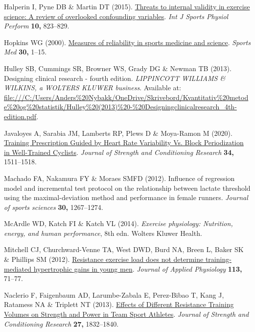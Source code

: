 \documentclass[
  letterpaper,
  DIV=11,
  numbers=noendperiod]{scrreprt}
\newlength{\cslhangindent}
\newenvironment{CSLReferences}[2] %
 {\begin{list}{}{%
  \setlength{\itemindent}{0pt}
  \setlength{\leftmargin}{0pt}
  \setlength{\parsep}{0pt}
  \ifodd #1
   \setlength{\leftmargin}{\cslhangindent}
   \setlength{\itemindent}{-1\cslhangindent}
  \fi
  \setlength{\itemsep}{#2\baselineskip}}}
 {\end{list}}
\begin{document}
\begin{CSLReferences}{1}{1}
Halperin I, Pyne DB \& Martin DT (2015).
\href{https://doi.org/10.1123/ijspp.2014-0566}{Threats to internal
validity in exercise science: A review of overlooked confounding
variables}. \emph{Int J Sports Physiol Perform} \textbf{10,} 823--829.

Hopkins WG (2000).
\href{http://www.ncbi.nlm.nih.gov/pubmed/10907753}{Measures of
reliability in sports medicine and science}. \emph{Sports Med}
\textbf{30,} 1--15.

Hulley SB, Cummings SR, Browner WS, Grady DG \& Newman TB (2013).
Designing clinical research - fourth edition. \emph{LIPPINCOTT WILLIAMS
\& WILKINS, a WOLTERS KLUWER business}. Available at:
\url{file:///C:/Users/Anders\%20Nybakk/OneDrive/Skrivebord/Kvantitativ\%20metode\%20og\%20statistik/Hulley\%20(2013)\%20-\%20Designingclinicalresearch_4th-edition.pdf}.

Javaloyes A, Sarabia JM, Lamberts RP, Plews D \& Moya-Ramon M (2020).
\href{https://doi.org/10.1519/jsc.0000000000003337}{Training
Prescription Guided by Heart Rate Variability Vs. Block Periodization in
Well-Trained Cyclists}. \emph{Journal of Strength and Conditioning
Research} \textbf{34,} 1511--1518.

Machado FA, Nakamura FY \& Moraes SMFD (2012). Influence of regression
model and incremental test protocol on the relationship between lactate
threshold using the maximal-deviation method and performance in female
runners. \emph{Journal of sports sciences} \textbf{30,} 1267--1274.

McArdle WD, Katch FI \& Katch VL (2014). \emph{Exercise physiology:
Nutrition, energy, and human performance}, 8th edn. Wolters Kluwer
Health.

Mitchell CJ, Churchward-Venne TA, West DWD, Burd NA, Breen L, Baker SK
\& Phillips SM (2012).
\href{https://doi.org/10.1152/japplphysiol.00307.2012}{Resistance
exercise load does not determine training-mediated hypertrophic gains in
young men}. \emph{Journal of Applied Physiology} \textbf{113,} 71--77.

Naclerio F, Faigenbaum AD, Larumbe-Zabala E, Perez-Bibao T, Kang J,
Ratamess NA \& Triplett NT (2013).
\href{https://doi.org/10.1519/jsc.0b013e3182736d10}{Effects of Different
Resistance Training Volumes on Strength and Power in Team Sport
Athletes}. \emph{Journal of Strength and Conditioning Research}
\textbf{27,} 1832--1840.


\end{CSLReferences}
\end{document}
